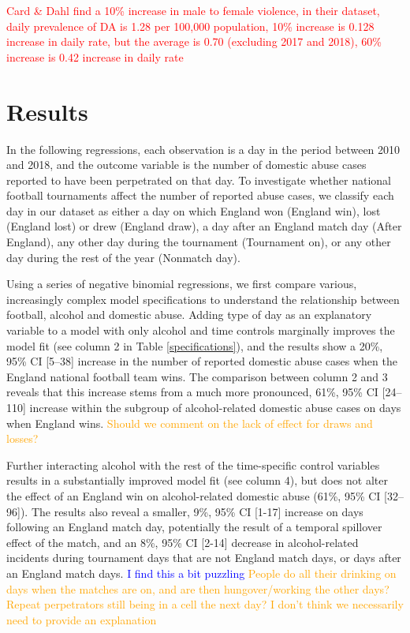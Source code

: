 \documentclass[12pt, letterpaper]{article}
\newcommand{\TM}[1] {{\textcolor{orange}{#1}}}
\newcommand{\AT}[1] {{\textcolor{blue}{#1}}}
\begin{document}
\textcolor{red}{Card \& Dahl find a 10\% increase in male to female violence, in their dataset, daily prevalence of DA is 1.28 per 100,000 population, 10\% increase is 0.128 increase in daily rate, but the average is 0.70 (excluding 2017 and 2018), 60\% increase is 0.42 increase in daily rate}

\clearpage


\section{Results}

In the following regressions, each observation is a day in the period between 2010 and 2018, and the outcome variable is the number of domestic abuse cases reported to have been perpetrated on that day. To investigate whether national football tournaments affect the number of reported abuse cases, we classify each day in our dataset as either a day on which England won (England win), lost (England lost) or drew (England draw), a day after an England match day (After England), any other day during the tournament (Tournament on), or any other day during the rest of the year (Nonmatch day). 

Using a series of negative binomial regressions, we first compare various, increasingly complex model specifications to understand the relationship between football, alcohol and domestic abuse. Adding type of day as an explanatory variable to a model with only alcohol and time controls marginally improves the model fit (see column 2 in Table \ref{specifications}), and the results show a 20\%, 95\% CI [5--38] increase in the number of reported domestic abuse cases when the England national football team wins. The comparison between column 2 and 3 reveals that this increase stems from a much more pronounced, 61\%, 95\% CI [24--110] increase within the subgroup of alcohol-related domestic abuse cases on days when England wins. \TM{Should we comment on the lack of effect for draws and losses?}

Further interacting alcohol with the rest of the time-specific control variables results in a substantially improved model fit (see column 4), but does not alter the effect of an England win on alcohol-related domestic abuse (61\%, 95\% CI [32--96]). The results also reveal a smaller, 9\%, 95\% CI [1-17] increase on days following an England match day, potentially the result of a temporal spillover effect of the match, and an 8\%, 95\% CI [2-14] decrease in alcohol-related incidents during tournament days that are not England match days, or days after an England match days. \AT{I find this a bit puzzling} \TM{People do all their drinking on days when the matches are on, and are then hungover/working the other days? Repeat perpetrators still being in a cell the next day? I don't think we necessarily need to provide an explanation}
\end{document}
